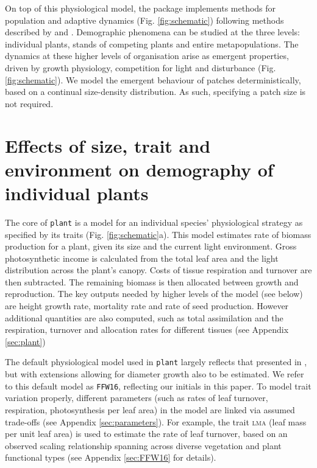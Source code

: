 \documentclass[a4paper,11pt]{article}
\newcommand{\plant}{\texttt{plant}}
\begin{document}
On top of this physiological model, the package implements methods for
population and adaptive dynamics (Fig.  \ref{fig:schematic}) following methods
described by \citet{Falster-2011} and \citet{Falster-2015}. Demographic
phenomena can be studied at the three levels: individual plants, stands of
competing plants and entire metapopulations. The dynamics at these higher
levels of organisation arise as emergent properties, driven by growth
physiology, competition for light and disturbance (Fig.  \ref{fig:schematic}).
We model the emergent behaviour of patches deterministically, based on a
continual  size-density distribution. As such, specifying a patch size
is not required.

\section{Effects of size, trait and environment on demography of individual plants}

The core of {\plant} is a model for an individual species'
physiological strategy as specified by its traits
(Fig. \ref{fig:schematic}a). This model estimates rate of biomass
production for a plant, given its size and the current light
environment. Gross photosynthetic income is calculated from the total
leaf area and the light distribution across the plant's canopy. Costs
of tissue respiration and turnover are then subtracted. The remaining
biomass is then allocated between growth and reproduction.  The key
outputs needed by higher levels of the model (see below) are height
growth rate, mortality rate and rate of seed production.  However
additional quantities are also computed, such as total assimilation
and the respiration, turnover and allocation rates for different
tissues (see Appendix \ref{sec:plant})

The default physiological model used in {\plant} largely reflects that
presented in \citet{Falster-2011,Falster-2015}, but with extensions
allowing for diameter growth also to be estimated. We refer to
this default model as \texttt{FFW16}, reflecting our initials in this
paper.  To model
trait variation properly, different parameters (such as rates of leaf turnover,
respiration, photosynthesis per leaf area) in the model are linked via
assumed trade-offs (see Appendix \ref{sec:parameters}).  For example, the trait
\textsc{lma} (leaf mass per unit leaf area) is used to estimate the
rate of leaf turnover, based on an observed scaling relationship
spanning across diverse vegetation and plant functional types
\citep{Wright-2004} (see Appendix \ref{sec:FFW16} for details).
\end{document}
